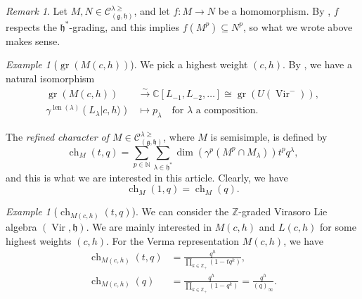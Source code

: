 \documentclass[a4paper, 12pt, reqno]{amsart}
\theoremstyle{remark}
\newtheorem{remark}[theorem]{Remark}
\newtheorem{example}[theorem]{Example}
\DeclareMathOperator{\Vir}{Vir}
\DeclareMathOperator{\ch}{ch}
\DeclareMathOperator{\len}{len}
\DeclareMathOperator{\gr}{gr}
\begin{document}
\begin{remark}
  \label{rmk:2}
  Let $M, N \in \mathcal{C}^{\lambda \ge}_{(\mathfrak{g}, \mathfrak{h})}$, and let $f: M \to N$ be a homomorphism.
  By , $f$ respects the $\mathfrak{h}^*$-grading, and this implies $f(M^p) \subseteq N^p$, so what we wrote above makes sense.
\end{remark}

\begin{example}[$\gr(M(c, h))$]
  \label{exa:6}
  We pick a highest weight $(c, h)$.
  By \cite[\S2]{dixmier_enveloping_1996}, we have a natural isomorphism
  \begin{align*}
    \gr(M(c, h)) &\xrightarrow{\sim} \mathbb{C}[L_{-1}, L_{-2}, \dots] \cong \gr(U(\Vir^{-})), \\
    \gamma^{\len(\lambda)}(L_{\lambda}|c, h\rangle) & \mapsto p_{\lambda} \quad \text{for $\lambda$ a composition}.
  \end{align*}
\end{example}

The \emph{refined character of $M \in \mathcal{C}^{\lambda \ge}_{(\mathfrak{g}, \mathfrak{h})}$}, where $M$ is semisimple, is defined by
\begin{equation*}
  \ch_M(t, q) = \sum_{p \in \mathbb{N}}\sum_{\lambda \in \mathfrak{h}^*}\dim(\gamma^p(M^p \cap M_{\lambda}))t^pq^{\lambda},
\end{equation*}
and this is what we are interested in this article.
Clearly, we have
\begin{equation*}
  \ch_M(1, q) = \ch_M(q).
\end{equation*}

\begin{example}[$\ch_{M(c, h)}(t, q)$]
  \label{exa:7}
  We can consider the $\mathbb{Z}$-graded Virasoro Lie algebra $(\Vir, \mathfrak{h})$.
  We are mainly interested in $M(c, h)$ and $L(c, h)$ for some highest weights $(c, h)$.
  For the Verma representation $M(c, h)$, we have
  \begin{align*}
    \ch_{M(c, h)}(t, q) &= \frac{q^h}{\prod_{k \in \mathbb{Z}_+}(1 - tq^k)}, \\
    \ch_{M(c, h)}(q) &= \frac{q^h}{\prod_{k \in \mathbb{Z}_+}(1 - q^k)} = \frac{q^h}{(q)_{\infty}}.
  \end{align*}
\end{example}
\end{document}
